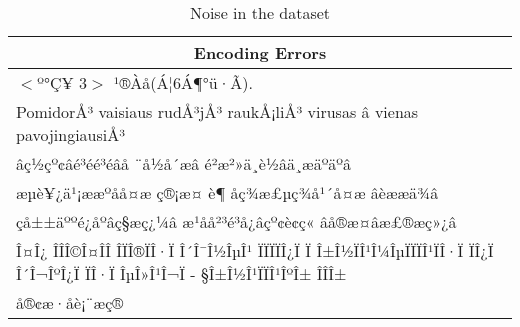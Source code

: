 \begin{table}[!htbp]
\vspace{0.5cm}

\begin{tabular}{|p{\textwidth}|}
\hline
\multicolumn{1}{|c|}{Encoding Errors} \\
\hline
$<$º°Ç¥ 3$>$ ¹®Àå(Á¦6Á¶°ü·Ã).\\
PomidorÅ³ vaisiaus rudÅ³jÅ³ raukÅ¡liÅ³ virusas â vienas pavojingiausiÅ³\\
âç½çº¢âé³éé³éâå ¨å½å´æâ é²æ²»ä¸è½âä¸æäºäºâ\\
æµè¥¿ä¹¡ææºåå¤æ ç®¡æ¤ è¶ åç¾æ£µç¾å¹´å¤æ âèææä¾â\\
çå±±äººé¿åºâç§æç¿¼â æ¹åå²³é³å¿âçº¢è¢ç« âå®æ¤âæ£®æç»¿â\\
Î¤Î¿ ÎÎÎ©Î¤ÎÎ ÎÏÎ®ÏÎ·Ï Î´Î¯Î½ÎµÎ¹ ÏÏÏÏÎ¿Ï Ï Î±Î½ÏÎ¹Î¼ÎµÏÏÏÎ¹ÏÎ·Ï ÏÎ¿Ï Î´Î¬ÎºÎ¿Ï ÏÎ·Ï ÎµÎ»Î¹Î¬Ï - §Î±Î½Î¹ÏÏÎ¹ÎºÎ± ÎÎÎ±\\
å®¢æ·åè¡¨æç®\\
\hline
\end{tabular}
\caption{Noise in the \VSI{} dataset}
\label{tab:04_noise}
\end{table}
